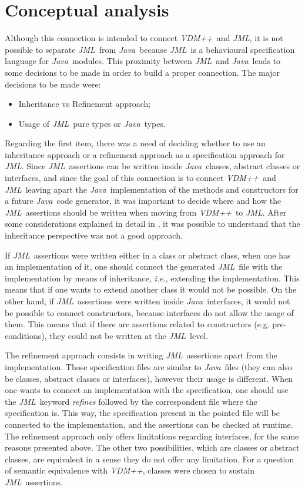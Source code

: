 \documentclass{llncs}
\newcommand{\jml}{\textit{JML}}
\newcommand{\vpp}{\textit{VDM++}}
\newcommand{\java}{\textit{Java}}
\newcommand{\ie}{\textit{i.e.}}
\begin{document}
\section{Conceptual analysis}
\label{sec:conceptual}

Although this connection is intended to connect \vpp\ and \jml, it is not possible to separate \jml\ from \java\ because \jml\ is a behavioural specification language for \java\ modules. This proximity between \jml\ and \java\ leads to some decisions to be made in order to build a proper connection. The major decisions to be made were:

\begin{itemize}
\item Inheritance vs Refinement approach;
\item Usage of \jml\ pure types or \java\ types.
\end{itemize}

Regarding the first item, there was a need of deciding whether to use an inheritance approach or a refinement approach as a specification approach for \jml. Since \jml\ assertions can be written inside \java\ classes, abstract classes or interfaces, and since the goal of this connection is to connect \vpp\ and \jml\ leaving apart the \java\ implementation of the methods and constructors for a future \java\ code generator, it was important to decide where and how the \jml\ assertions should be written when moving from \vpp\ to \jml. After some considerations explained in detail in \cite{vppjmlthesis}, it was possible to understand that the inheritance perspective was not a good approach. 

If \jml\ assertions were written either in a class or abstract class, when one has an implementation of it, one should connect the generated \jml\ file with the implementation by means of inheritance, \ie, extending the implementation. This means that if one wants to extend another class it would not be possible. On the other hand, if \jml\ assertions were written inside \java\ interfaces, it would not be possible to connect constructors, because interfaces do not allow the usage of them. This means that if there are assertions related to constructors (e.g. pre-conditions), they could not be written at the \jml\ level.

The refinement approach consists in writing \jml\ assertions apart from the implementation. Those specification files are similar to \java\ files (they can also be classes, abstract classes or interfaces), however their usage is different. When one wants to connect an implementation with the specification, one should use the \jml\ keyword \textit{refines} followed by the correspondent file where the specification is. This way, the specification present in the pointed file will be connected to the implementation, and the assertions can be checked at runtime. The refinement approach only offers limitations regarding interfaces, for the same reasons presented above. The other two possibilities, which are classes or abstract classes, are equivalent in a sense they do not offer any limitation. For a question of semantic equivalence with \vpp, classes were chosen to sustain \jml\ assertions.
\end{document}
